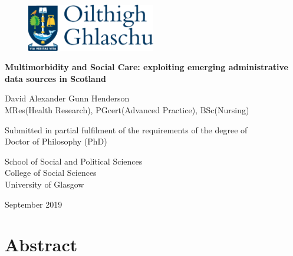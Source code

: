 \documentclass[12pt,a4paper,oneside,table]{report}
\author{}
\date{\vspace{-2.5em}}
\begin{document}

\thispagestyle{empty}

\begin{centering}

\begin{figure}[h]
  \centering
    \includegraphics[width = 0.5\textwidth]{figures/title-page/Ghlaschu.pdf}
\end{figure}

\vspace{2 cm}

\Huge

{\bf Multimorbidity and Social Care: exploiting emerging administrative data sources in Scotland}

\vspace{1.5 cm}

\Large
David Alexander Gunn Henderson \\
MRes(Health Research), PGcert(Advanced Practice), BSc(Nursing)

\vspace{1.5 cm}

\normalsize
Submitted in partial fulfilment of the requirements of the degree of \\
Doctor of Philosophy (PhD)

\vspace{1.5 cm}

\normalsize
School of Social and Political Sciences \\
College of Social Sciences\\
University of Glasgow

September 2019

\end{centering}

\newpage
\pagestyle{fancy}

\fancyhead[LE,RO]{}
\fancyhead[LO,RE]{}
\renewcommand{\headrulewidth}{0pt}
\renewcommand{\footrulewidth}{0pt}

\section*{Abstract}

\thispagestyle{empty}
\end{document}
